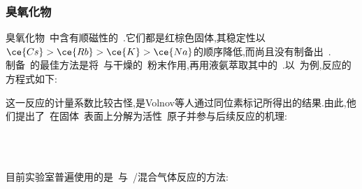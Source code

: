 \documentclass{ctexbook}
\begin{document}
\subsubsection{臭氧化物}
臭氧化物~中含有顺磁性的~.它们都是红棕色固体,其稳定性以$\ce{Cs}>\ce{Rb}>\ce{K}>\ce{Na}$的顺序降低,而尚且没有制备出~.\\
\indent 制备~的最佳方法是将~与干燥的~粉末作用,再用液氨萃取其中的~.以~为例,反应的方程式如下:
\begin{tightcenter}
\end{tightcenter}
这一反应的计量系数比较古怪,是Volnov等人通过同位素标记所得出的结果\cite{Volnov1967}.由此,他们提出了~在固体~表面上分解为活性~原子并参与后续反应的机理:
\begin{tightcenter}
    \\
    \\
\end{tightcenter}
目前实验室普遍使用的是~与~/混合气体反应的方法\cite{Schnick1987}:
\begin{tightcenter}
\end{tightcenter}
\end{document}
